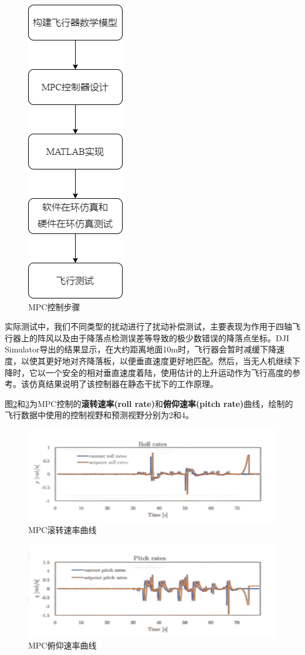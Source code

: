\begin{figure}[ht]
  \centering
  \includegraphics[width=0.2\linewidth]{./Figure/MPC_Control_Steps.png}
  \caption{MPC控制步骤}\label{Fig:img16_add}
\end{figure}

实际测试中，我们不同类型的扰动进行了扰动补偿测试，主要表现为作用于四轴飞行器上的阵风以及由于降落点检测误差等导致的极少数错误的降落点坐标。\cite{ArtE15}DJI Simulator导出的结果显示，在大约距离地面10m时，飞行器会暂时减缓下降速度，以使其更好地对齐降落板，以便垂直速度更好地匹配。然后，当无人机继续下降时，它以一个安全的相对垂直速度着陆，使用估计的上升运动作为飞行高度的参考。该仿真结果说明了该控制器在静态干扰下的工作原理。

图\ref{Fig:img17}和\ref{Fig:img18}为MPC控制的\textbf{滚转速率(roll rate)}和\textbf{俯仰速率(pitch rate)}曲线，绘制的飞行数据中使用的控制视野和预测视野分别为2和4。

\begin{figure}[ht]
  \centering
  \includegraphics[width=0.8\linewidth]{./Figure/MPC-Roll-Rates.png}
  \caption{MPC滚转速率曲线}\label{Fig:img17}
\end{figure}

\begin{figure}[ht]
  \centering
  \includegraphics[width=0.8\linewidth]{./Figure/MPC-Pitch-Rates.png}
  \caption{MPC俯仰速率曲线}\label{Fig:img18}
\end{figure}

